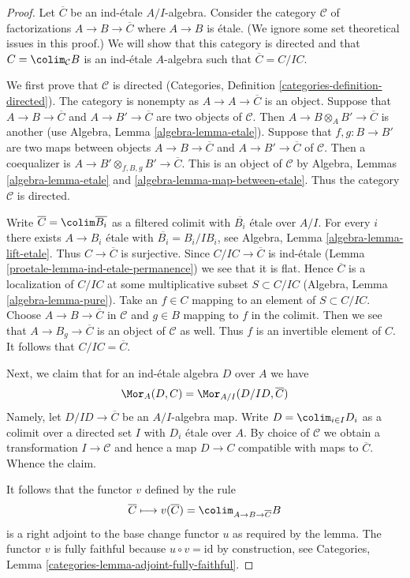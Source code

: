 \begin{proof}

Let $\overline{C}$ be an ind-\'etale $A/I$-algebra.
Consider the category $\mathcal{C}$ of factorizations
$A \to B \to \overline{C}$ where $A \to B$ is \'etale.
(We ignore some set theoretical issues in this proof.)
We will show that this category is directed and that
$C = \colim_\mathcal{C} B$ is an ind-\'etale $A$-algebra
such that $\overline{C} = C/IC$.

\medskip\noindent
We first prove that $\mathcal{C}$ is directed
(Categories, Definition \ref{categories-definition-directed}).
The category is nonempty as $A \to A \to \overline{C}$ is an object.
Suppose that $A \to B \to \overline{C}$ and $A \to B' \to \overline{C}$
are two objects of $\mathcal{C}$. Then $A \to B \otimes_A B' \to \overline{C}$
is another (use Algebra, Lemma \ref{algebra-lemma-etale}).
Suppose that $f, g : B \to B'$ are two maps between
objects $A \to B \to \overline{C}$ and $A \to B' \to \overline{C}$
of $\mathcal{C}$. Then a coequalizer is
$A \to B' \otimes_{f, B, g} B' \to \overline{C}$.
This is an object of $\mathcal{C}$ by
Algebra, Lemmas \ref{algebra-lemma-etale} and
\ref{algebra-lemma-map-between-etale}.
Thus the category $\mathcal{C}$ is directed.

\medskip\noindent
Write $\overline{C} = \colim \overline{B_i}$ as a filtered colimit with
$\overline{B_i}$ \'etale over $A/I$. For every $i$
there exists $A \to B_i$ \'etale with $\overline{B_i} = B_i/IB_i$, see
Algebra, Lemma \ref{algebra-lemma-lift-etale}.
Thus $C \to \overline{C}$ is surjective.
Since $C/IC \to \overline{C}$ is ind-\'etale
(Lemma \ref{proetale-lemma-ind-etale-permanence})
we see that it is flat. Hence $\overline{C}$ is a localization of
$C/IC$ at some multiplicative subset $S \subset C/IC$
(Algebra, Lemma \ref{algebra-lemma-pure}).
Take an $f \in C$ mapping to an element of $S \subset C/IC$.
Choose $A \to B \to \overline{C}$ in $\mathcal{C}$ and $g \in B$
mapping to $f$ in the colimit. Then we see that $A \to B_g \to \overline{C}$
is an object of $\mathcal{C}$ as well. Thus $f$ is an invertible
element of $C$. It follows that $C/IC = \overline{C}$.

\medskip\noindent
Next, we claim that for an ind-\'etale algebra $D$ over $A$ we have
$$
\Mor_A(D, C) = \Mor_{A/I}(D/ID, \overline{C})
$$
Namely, let $D/ID \to \overline{C}$ be an $A/I$-algebra map.
Write $D = \colim_{i \in I} D_i$ as a colimit over a directed set $I$
with $D_i$ \'etale over $A$. By choice of $\mathcal{C}$
we obtain a transformation $I \to \mathcal{C}$ and hence a map
$D \to C$ compatible with maps to $\overline{C}$. Whence the claim.

\medskip\noindent
It follows that the functor $v$ defined by the rule
$$
\overline{C}
\longmapsto
v(\overline{C}) = \colim_{A \to B \to \overline{C}} B
$$
is a right adjoint to the base change functor $u$ as required by the lemma.
The functor $v$ is fully faithful because
$u \circ v = \text{id}$ by construction, see
Categories, Lemma \ref{categories-lemma-adjoint-fully-faithful}.
\end{proof}

